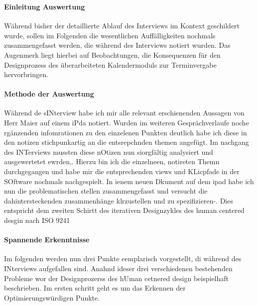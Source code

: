 \documentclass[12pt]{article}
\newcommand{\ipName}{Herr Maier }
\begin{document}
\subsubsection{}

\paragraph{Einleitung Auswertung}
Während bisher der detaillierte Ablauf des Interviews im Kontext geschildert
wurde, sollen im Folgenden die wesentlichen Auffälligkeiten nochmals
zusammengefasst werden, die während des Interviews notiert wurden. Das
Augenmerk liegt hierbei auf Beobachtungen, die Konsequenzen für den
Designprozess des überarbeiteten Kalendermoduls zur Terminvergabe
hervorbringen.

\paragraph{Methode der Auswertung}
Während de sINterview habe ich mir alle relevant erschienenden Aussagen von \ipName auf einem iPda notiert. Wurden im weiteren Gesprächverlaufe noche rgänzenden infomrationen zu den einzelenen Punkten deutlich habe ich diese in den notizen stichpunkartig an die entsrepchnden themen angefügt. Im nachgang des INTerviews mussten diese nOtizen nun siorgfältig analysiert und ausgewertetet ewrden,. Hierzu bin ich die einzelneen, notireten Themn durchgegangen und habe mir die entsprechenden views und KLicpfade in der SOftware nochmals nachgespielt. In ienem neuen Dkument auf dem ipad habe ich nun die problematischen stellen zusammengefasst und versucht die dahintersteckenden zusammenhänge klrzustellen und zu spezifizieren-. Dies entspricht dem zweiten Schirtt des iterativen Designzykles des human centered desgin nach ISO 9241 \cite{iso9241}

\paragraph{Spannende Erkenntnisse}
Im folgenden werden nun drei Punkte eemplarisch vorgestellt, di während des INterviews aufgefallen sind. Anahnd ideser drei verschiedenen bestehenden Probleme wor der Designprozerss des hUman cetnered design beispielhaft beschrieben. Im ersten schritt geht es um das Erkennen der Optimierungswürdigen Punkte.
\end{document}
